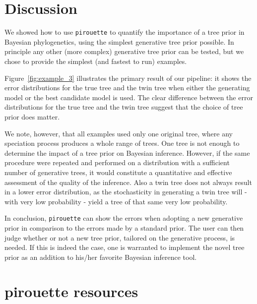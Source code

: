\section{Discussion}

We showed how to use \verb;pirouette; to quantify the importance of a 
tree prior in Bayesian phylogenetics, using the simplest generative tree 
prior possible.
In principle any other (more complex) generative tree prior can be tested, 
but we chose to provide the simplest (and fastest to run) examples.

Figure~\ref{fig:example_3} illustrates the primary result of our pipeline: 
it shows the error distributions for the true tree and the twin tree 
when either the generating model or the best candidate model is used. 
The clear difference between the error distributions 
for the true tree and the twin tree suggest 
that the choice of tree prior does matter.

We note, however, that all examples used only one original tree,
where any speciation process produces a whole range of trees.
One tree is not enough to determine the impact 
of a tree prior on Bayesian inference.
However, if the same procedure were repeated and 
performed on a distribution with a sufficient number of generative trees, 
it would constitute a quantitative and effective assessment of the 
quality of the inference.
Also a twin tree does not always result in a lower error distribution,
as the stochasticity in generating a twin tree will - with
very low probability - yield a tree of that same very low probability.

In conclusion, \verb;pirouette; can show the errors
when adopting a new generative prior
in comparison to the errors made by a standard prior.
The user can then judge whether or not a new tree prior, 
tailored on the generative process, is needed. 
If this is indeed the case, one is warranted to implement 
the novel tree prior as an addition to 
his/her favorite Bayesian inference tool.

\section{pirouette resources}

